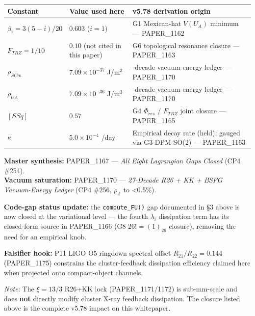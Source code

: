 \documentclass[12pt,a4paper]{article}
\begin{document}
\begin{table}[H]
\centering
\small
\begin{tabularx}{\linewidth}{@{}>{\raggedright\arraybackslash}X>{\raggedright\arraybackslash}X>{\raggedright\arraybackslash}X@{}}
\toprule
Constant & Value used here & v5.78 derivation origin \tabularnewline
\midrule
$\beta_i = 3(5-i)/20$ & $0.603$ ($i=1$) & G1 Mexican-hat $V(U_A)$ minimum --- PAPER\_1162 \tabularnewline
$F_{TRZ} = 1/10$ & $0.10$ (not cited in this paper) & G6 topological resonance closure --- PAPER\_1163 \tabularnewline
$\rho_{SCm}$ & $7.09\times10^{-37}$ J/m$^{3}$ & 27-decade vacuum-energy ledger --- PAPER\_1170 \tabularnewline
$\rho_{UA}$ & $7.09\times10^{-36}$ J/m$^{3}$ & 27-decade vacuum-energy ledger --- PAPER\_1170 \tabularnewline
$[SSq]$ & $0.57$ & G4 $\Phi_{res}$ / $F_{TRZ}$ joint closure --- PAPER\_1165 \tabularnewline
$\kappa$ & $5.0\times10^{-4}$ /day & Empirical decay rate (held); gauged via G3 DPM SO(2) --- PAPER\_1163 \tabularnewline
\bottomrule
\end{tabularx}
\end{table}

\begin{flushleft}
\textbf{Master synthesis:} PAPER\_1167 --- \emph{All Eight Lagrangian Gaps Closed} (CP4 \#254). \\
\textbf{Vacuum saturation:} PAPER\_1170 --- \emph{27-Decade R26 + KK + BSFG Vacuum-Energy Ledger} (CP4 \#256, $\rho_\Lambda$ to <0.5\%). \\
\end{flushleft}

\textbf{Code-gap status update:} the \texttt{compute\_FU()} gap documented in \S{}3 above is now closed at the variational level --- the fourth $\lambda_i$ dissipation term has its closed-form source in PAPER\_1166 (G8 $26!=(1)_{26}$ closure), removing the need for an empirical knob.

\textbf{Falsifier hook:} P11 LIGO O5 ringdown spectral offset $R_{21}/R_{22}=0.144$ (PAPER\_1175) constrains the cluster-feedback dissipation efficiency claimed here when projected onto compact-object channels.

\emph{Note:} The $\xi=13/3$ R26+KK lock (PAPER\_1171/1172) is sub-mm-scale and does \textbf{not} directly modify cluster X-ray feedback dissipation. The closure listed above is the complete v5.78 impact on this whitepaper.
\end{document}
